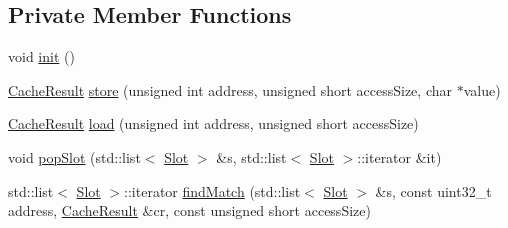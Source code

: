 \subsection*{Private Member Functions}
\begin{DoxyCompactItemize}
\item 
void \hyperlink{class_cache_a9eff392a40b6c8dd333526a7056b49e2}{init} ()
\item 
\hyperlink{struct_cache_1_1_cache_result}{Cache\-Result} \hyperlink{class_cache_ac81651199b4de348322ffc2c48a7d2d5}{store} (unsigned int address, unsigned short access\-Size, char $\ast$value)
\item 
\hyperlink{struct_cache_1_1_cache_result}{Cache\-Result} \hyperlink{class_cache_ae92ebc23799f54b5daa542a3082f9e3b}{load} (unsigned int address, unsigned short access\-Size)
\item 
void \hyperlink{class_cache_a3ead228320f45b541885be05f549ef30}{pop\-Slot} (std\-::list$<$ \hyperlink{struct_cache_1_1_slot}{Slot} $>$ \&s, std\-::list$<$ \hyperlink{struct_cache_1_1_slot}{Slot} $>$\-::iterator \&it)
\item 
std\-::list$<$ \hyperlink{struct_cache_1_1_slot}{Slot} $>$\-::iterator \hyperlink{class_cache_ad514dd2063269a11a30eabbd6b65fbf4}{find\-Match} (std\-::list$<$ \hyperlink{struct_cache_1_1_slot}{Slot} $>$ \&s, const uint32\-\_\-t address, \hyperlink{struct_cache_1_1_cache_result}{Cache\-Result} \&cr, const unsigned short access\-Size)
\end{DoxyCompactItemize}
